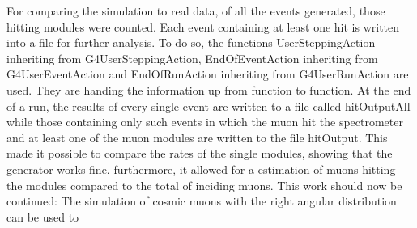   For comparing the simulation to real data, of all the events generated, those hitting modules were counted. Each event containing at least one hit is written into a file for further analysis. To do so, the functions UserSteppingAction inheriting from G4UserSteppingAction, EndOfEventAction inheriting from G4UserEventAction and EndOfRunAction inheriting from G4UserRunAction are used.  They are handing the information up from function to function. 
  At the end of a run, the results of every single event are written to a file called hitOutputAll while those containing only such events in which the muon hit the spectrometer and at least one of the muon modules are written to the file hitOutput.
  This made it possible to compare the rates of the single modules, showing that the generator works fine. furthermore, it allowed for a estimation of muons hitting the modules compared to the total of inciding muons.
  This work should now be continued: The simulation of cosmic muons with the right angular distribution can be used to 
  
  
  
  
  